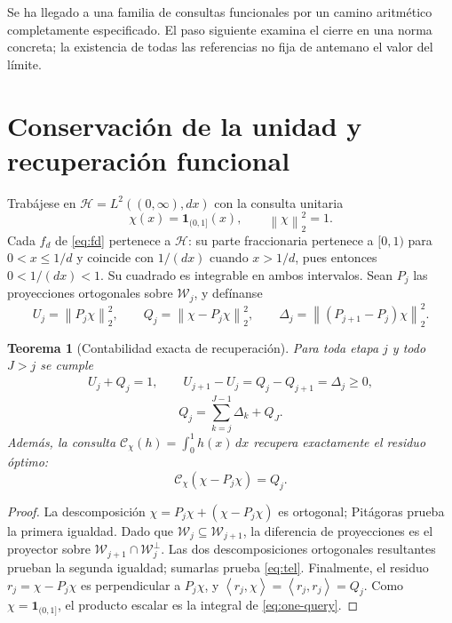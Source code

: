 \documentclass[11pt,a4paper]{article}
\theoremstyle{mine}
\newtheorem{teorema}{Teorema}[section]
\theoremstyle{definition}
\newcommand{\HH}{\mathcal H}
\newcommand{\WW}{\mathcal W}
\newcommand{\norm}[1]{\left\lVert#1\right\rVert}
\newcommand{\inner}[2]{\left\langle#1,#2\right\rangle}
\begin{document}
Se ha llegado a una familia de consultas funcionales por un camino aritmético completamente especificado. El paso siguiente examina el cierre en una norma concreta; la existencia de todas las referencias no fija de antemano el valor del límite.

\section{Conservación de la unidad y recuperación funcional}

Trabájese en $\HH=L^2((0,\infty),dx)$ con la consulta unitaria
\begin{equation}\label{eq:target}
\chi(x)=\mathbf1_{(0,1]}(x),\qquad \norm\chi_2^2=1.
\end{equation}
Cada $f_d$ de \eqref{eq:fd} pertenece a $\HH$: su parte fraccionaria pertenece a $[0,1)$ para $0<x\le1/d$ y coincide con $1/(dx)$ cuando $x>1/d$, pues entonces $0<1/(dx)<1$. Su cuadrado es integrable en ambos intervalos. Sean $P_j$ las proyecciones ortogonales sobre $\WW_j$, y defínanse
\begin{equation}\label{eq:UQ}
U_j=\norm{P_j\chi}_2^2,\qquad Q_j=\norm{\chi-P_j\chi}_2^2,
\qquad\Delta_j=\norm{(P_{j+1}-P_j)\chi}_2^2.
\end{equation}

\begin{teorema}[Contabilidad exacta de recuperación]\label{th:conserv}
Para toda etapa $j$ y todo $J>j$ se cumple
\begin{align}\label{eq:budget}
\boxed{U_j+Q_j=1,}\qquad
\boxed{U_{j+1}-U_j=Q_j-Q_{j+1}=\Delta_j\ge0,}
\end{align}
\begin{equation}\label{eq:tel}
\boxed{\quad Q_j=\sum_{k=j}^{J-1}\Delta_k+Q_J.\quad}
\end{equation}
Además, la consulta $\mathcal C_\chi(h)=\int_0^1h(x)\,dx$ recupera exactamente el residuo óptimo:
\begin{equation}\label{eq:one-query}
\boxed{\quad \mathcal C_\chi(\chi-P_j\chi)=Q_j.\quad}
\end{equation}
\end{teorema}
\begin{proof}
La descomposición $\chi=P_j\chi+(\chi-P_j\chi)$ es ortogonal; Pitágoras prueba la primera igualdad. Dado que $\WW_j\subseteq\WW_{j+1}$, la diferencia de proyecciones es el proyector sobre $\WW_{j+1}\cap\WW_j^\perp$. Las dos descomposiciones ortogonales resultantes prueban la segunda igualdad; sumarlas prueba \eqref{eq:tel}. Finalmente, el residuo $r_j=\chi-P_j\chi$ es perpendicular a $P_j\chi$, y
$\inner{r_j}{\chi}=\inner{r_j}{r_j}=Q_j$. Como $\chi=\mathbf 1_{(0,1]}$, el producto escalar es la integral de \eqref{eq:one-query}.
\end{proof}
\end{document}
